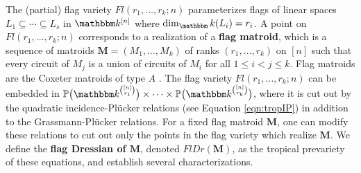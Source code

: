 \documentclass[11pt]{amsart}
\newcommand{\MM}{{\boldsymbol M}}
\newcommand{\kk}{\mathbbm k}
\theoremstyle{definition}
\begin{document}
The (partial) flag variety $Fl(r_1,\ldots,r_k;n)$ parameterizes flags of linear spaces $L_1 \subseteq \cdots \subseteq L_s$ in $\kk^{[n]}$ where $\dim_\kk(L_i) = r_i$.
A point on $Fl(r_1, \ldots, r_k;n)$ corresponds to a realization of a \textbf{flag matroid}, which is a sequence of matroids $\MM = (M_1, \ldots, M_k)$ of ranks $(r_1, \ldots, r_k)$ on $[n]$ such that every circuit of $M_{j}$ is a union of circuits of $M_{i}$ for all $1 \leq i <j\leq k$.
Flag matroids are the Coxeter matroids of type $A$ \cite{BGW03}.
The flag variety $Fl(r_1, \ldots, r_k;n)$ can be embedded in $\mathbb{P}\big( \kk^{\binom{[n]}{r_1}}\big) \times \cdots \times\mathbb{P}\big( \kk^{\binom{[n]}{r_k}}\big)$,
where it is cut out by the quadratic incidence-Pl\"{u}cker relations
(see Equation \eqref{eqn:tropIP})
in addition to the Grassmann-Pl\"ucker relations. 
For a fixed flag matroid $\MM$, one can modify these relations to cut out only the points in the flag variety which realize $\MM$.  We define the \textbf{flag Dressian of $\MM$}, denoted $FlDr(\MM)$, as the tropical prevariety of these equations, and establish several characterizations.
\end{document}
